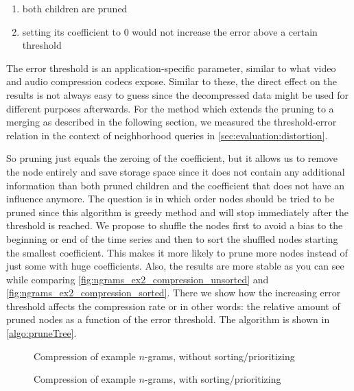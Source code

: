 \begin{enumerate}
    \item both children are pruned
    \item setting its coefficient to $0$ would not increase the error above a certain threshold
\end{enumerate}

The error threshold is an application-specific parameter, similar to what video and audio compression codecs expose. Similar to these, the direct effect on the results is not always easy to guess since the decompressed data might be used for different purposes afterwards. For the method which extends the pruning to a merging as described in the following section, we measured the threshold-error relation in the context of neighborhood queries in \autoref{sec:evaluation:distortion}.

So pruning just equals the zeroing of the coefficient, but it allows us to remove the node entirely and save storage space since it does not contain any additional information than both pruned children and the coefficient that does not have an influence anymore. The question is in which order nodes should be tried to be pruned since this algorithm is greedy method and will stop immediately after the threshold is reached. We propose to shuffle the nodes first to avoid a bias to the beginning or end of the time series and then to sort the shuffled nodes starting the smallest coefficient. This makes it more likely to prune more nodes instead of just some with huge coefficients. Also, the results are more stable as you can see while comparing \autoref{fig:ngrams_ex2_compression_unsorted} and \autoref{fig:ngrams_ex2_compression_sorted}. There we show how the increasing error threshold affects the compression rate or in other words: the relative amount of pruned nodes as a function of the error threshold. The algorithm is shown in \autoref{algo:pruneTree}.

\begin{figure}
    \centering
    
    \caption[Compression using tree pruning, w/o sorting]{Compression of example $n$-grams, without sorting\slash{}prioritizing}\label{fig:ngrams_ex2_compression_unsorted}
\end{figure}

\begin{figure}
    \centering
    
    \caption[Compression using tree pruning, w/ sorting]{Compression of example $n$-grams, with sorting\slash{}prioritizing}\label{fig:ngrams_ex2_compression_sorted}
\end{figure}



